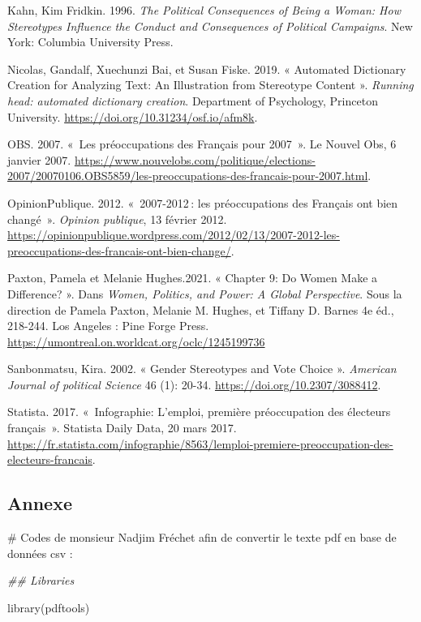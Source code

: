 \documentclass[
  letterpaper,
  DIV=11,
  numbers=noendperiod]{scrartcl}
\newenvironment{Shaded}{\begin{snugshade}}{\end{snugshade}}
\newcommand{\CommentTok}[1]{\textcolor[rgb]{0.37,0.37,0.37}{#1}}
\newcommand{\DocumentationTok}[1]{\textcolor[rgb]{0.37,0.37,0.37}{\textit{#1}}}
\newcommand{\FunctionTok}[1]{\textcolor[rgb]{0.28,0.35,0.67}{#1}}
\newcommand{\NormalTok}[1]{\textcolor[rgb]{0.00,0.23,0.31}{#1}}
\begin{document}
Kahn, Kim Fridkin. 1996. \emph{The Political Consequences of Being a
Woman: How Stereotypes Influence the Conduct and Consequences of
Political Campaigns}. New York: Columbia University Press.

Nicolas, Gandalf, Xuechunzi Bai, et Susan Fiske. 2019. « Automated
Dictionary Creation for Analyzing Text: An Illustration from Stereotype
Content ». \emph{Running head: automated dictionary creation}.
Department of Psychology, Princeton University.
\url{https://doi.org/10.31234/osf.io/afm8k}.

OBS. 2007. «~Les préoccupations des Français pour 2007~». Le Nouvel Obs,
6 janvier 2007.
\url{https://www.nouvelobs.com/politique/elections-2007/20070106.OBS5859/les-preoccupations-des-francais-pour-2007.html}.

OpinionPublique. 2012. «~2007-2012\,: les préoccupations des Français
ont bien changé~». \emph{Opinion publique}, 13 février 2012.
\url{https://opinionpublique.wordpress.com/2012/02/13/2007-2012-les-preoccupations-des-francais-ont-bien-change/}.

Paxton, Pamela et Melanie Hughes.2021. « Chapter 9: Do Women Make a
Difference? ». Dans \emph{Women, Politics, and Power: A Global
Perspective}. Sous la direction de Pamela Paxton, Melanie M. Hughes, et
Tiffany D. Barnes 4e éd., 218-244. Los Angeles : Pine Forge Press.
\url{https://umontreal.on.worldcat.org/oclc/1245199736}

Sanbonmatsu, Kira. 2002. « Gender Stereotypes and Vote Choice ».
\emph{American Journal of political Science} 46 (1): 20-34.
\url{https://doi.org/10.2307/3088412}.

Statista. 2017. «~Infographie: L'emploi, première préoccupation des
électeurs français~». Statista Daily Data, 20 mars 2017.
\url{https://fr.statista.com/infographie/8563/lemploi-premiere-preoccupation-des-electeurs-francais}.

\hypertarget{annexe}{%
\subsection{Annexe}\label{annexe}}

\begin{Shaded}
\begin{Highlighting}[]
\CommentTok{\# Codes de monsieur Nadjim Fréchet afin de convertir le texte pdf en base de données csv : }

\DocumentationTok{\#\# Libraries}

\FunctionTok{library}\NormalTok{(pdftools)}
\end{Highlighting}
\end{Shaded}
\end{document}
